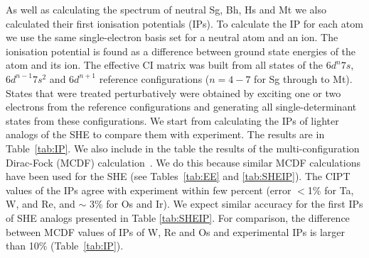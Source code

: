 \documentclass[10pt,a4paper, twoside, openright]{report}
\begin{document}
As well as calculating the spectrum of neutral Sg, Bh, Hs and Mt we also calculated their first ionisation potentials (IPs). To calculate the IP for each atom we use the same single-electron basis set for a neutral atom and an ion. The ionisation potential is found as a difference between ground state energies of the atom and its ion. The effective CI matrix was built from all states of the $6d^n 7s$, $6d^{n-1}7s^2$ and $6d^{n+1}$ reference configurations ($n=4-7$ for Sg through to Mt). States that were treated perturbatively were obtained by exciting one or two electrons from the reference configurations and generating all single-determinant states from these configurations. We start from calculating the IPs of lighter analogs of the SHE to compare them with experiment. The results are in Table~\ref{tab:IP}. We also include in the table the results of the multi-configuration Dirac-Fock (MCDF) calculation~\cite{Johnson1999, Johnson2002}. We do this because similar MCDF calculations have been used for the SHE (see Tables~\ref{tab:EE} and \ref{tab:SHEIP}). The CIPT values of the IPs agree with experiment within few percent (error $<$1\% for Ta, W, and Re, and $\sim$ 3\% for Os and Ir). We expect similar accuracy for the first IPs of SHE analogs presented in Table \ref{tab:SHEIP}.  For comparison, the difference between MCDF values of IPs of W, Re and Os and experimental IPs is larger than 10\% (Table~\ref{tab:IP}).
\end{document}
